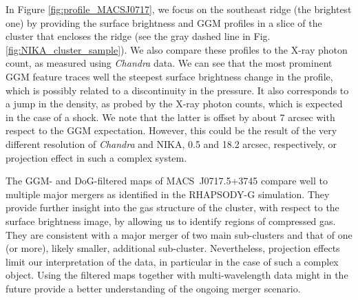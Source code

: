\documentclass[traditabstract]{aa}
\begin{document}
In Figure \ref{fig:profile_MACSJ0717}, we focus on the southeast ridge (the brightest one) by providing the surface brightness and GGM profiles in a slice of the cluster that encloses the ridge (see the gray dashed line in Fig. \ref{fig:NIKA_cluster_sample}). We also compare these profiles to the X-ray photon count, as measured using \textit{Chandra} data. We can see that the most prominent GGM feature traces well the steepest surface brightness change in the profile, which is possibly related to a discontinuity in the pressure. It also corresponds to a jump in the density, as probed by the X-ray photon counts, which is expected in the case of a shock. We note that the latter is offset by about 7 arcsec with respect to the GGM expectation. However, this could be the result of the very different resolution of \textit{Chandra} and NIKA, 0.5 and 18.2 arcsec, respectively, or projection effect in such a complex system.

The GGM- and DoG-filtered maps of \mbox{MACS~J0717.5+3745} compare well to multiple major mergers as identified in the RHAPSODY-G simulation. They provide further insight into the gas structure of the cluster, with respect to the surface brightness image, by allowing us to identify regions of compressed gas. They are consistent with a major merger of two main sub-clusters and that of one (or more), likely smaller, additional sub-cluster. Nevertheless, projection effects limit our interpretation of the data, in particular in the case of such a complex object. Using the filtered maps together with multi-wavelength data might in the future provide a better understanding of the ongoing merger scenario.
\end{document}

